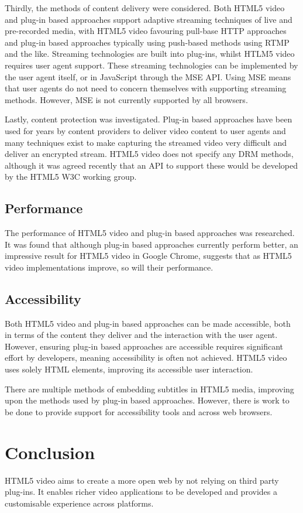 \documentclass[journal]{IEEEtran}
\begin{document}
Thirdly, the methods of content delivery were considered. Both HTML5 video and plug-in based approaches support adaptive streaming techniques of live and pre-recorded media, with HTML5 video favouring pull-base HTTP approaches and plug-in based approaches typically using push-based methods using RTMP and the like. Streaming technologies are built into plug-ins, whilst HTLM5 video requires user agent support. These streaming technologies can be implemented by the user agent itself, or in JavaScript through the MSE API. Using MSE means that user agents do not need to concern themselves with supporting streaming methods. However, MSE is not currently supported by all browsers.

Lastly, content protection was investigated. Plug-in based approaches have been used for years by content providers to deliver video content to user agents and many techniques exist to make capturing the streamed video very difficult and deliver an encrypted stream. HTML5 video does not specify any DRM methods, although it was agreed recently that an API to support these would be developed by the HTML5 W3C working group.

\subsection{Performance}
The performance of HTML5 video and plug-in based approaches was researched. It was found that although plug-in based approaches currently perform better, an impressive result for HTML5 video in Google Chrome, suggests that as HTML5 video implementations improve, so will their performance. 

\subsection{Accessibility}
Both HTML5 video and plug-in based approaches can be made accessible, both in terms of the content they deliver and the interaction with the user agent. However, ensuring plug-in based approaches are accessible requires significant effort by developers, meaning accessibility is often not achieved. HTML5 video uses solely HTML elements, improving its accessible user interaction.

There are multiple methods of embedding subtitles in HTML5 media, improving upon the methods used by plug-in based approaches. However, there is work to be done to provide support for accessibility tools and across web browsers.

\section{Conclusion}
HTML5 video aims to create a more open web by not relying on third party plug-ins. It enables richer video applications to be developed and provides a customisable experience across platforms.
\end{document}
